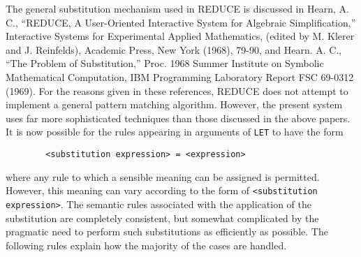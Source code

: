 \documentclass[11pt,letterpaper]{book}
\newcommand{\REDUCE}{REDUCE}
\begin{document}
The general substitution mechanism used in {\REDUCE} is discussed in Hearn, A.
C., ``{\REDUCE}, A User-Oriented Interactive System for Algebraic
Simplification,'' Interactive Systems for Experimental Applied Mathematics,
(edited by M. Klerer and J. Reinfelds), Academic Press, New York (1968),
79-90, and Hearn. A. C., ``The Problem of Substitution,'' Proc. 1968 Summer
Institute on Symbolic Mathematical Computation, IBM Programming Laboratory
Report FSC 69-0312 (1969). For the reasons given in these
references, {\REDUCE} does not attempt to implement a general pattern
matching algorithm.  However, the present system uses far more sophisticated
techniques than those discussed in the above papers.  It is now possible for
the rules appearing in arguments of {\tt LET} to have the form
{\small\begin{verbatim}
        <substitution expression> = <expression>
\end{verbatim}}
where any rule to which a sensible meaning can be assigned is permitted.
However, this meaning can vary according to the form of {\tt <substitution
expression>}. The semantic rules associated with the application of the
substitution are completely consistent, but somewhat complicated by the
pragmatic need to perform such substitutions as efficiently as possible.
The following rules explain how the majority of the cases are handled.
\end{document}
